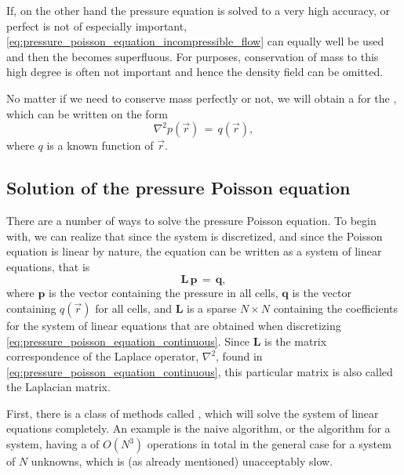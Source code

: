 If, on the other hand the pressure equation is solved to a very high accuracy, or perfect  is not of especially important, \eqref{eq:pressure_poisson_equation_incompressible_flow} can equally well be used and then the  becomes superfluous. For \simulation purposes, conservation of mass to this high degree is often not important and hence the density field can be omitted.

No matter if we need to conserve mass perfectly or not, we will obtain a  for the , which can be written on the form
%
\begin{equation} \label{eq:pressure_poisson_equation_continuous}
\nabla^2 p(\vec{r}) \,=\, q(\vec{r}),
\end{equation}
%
where $q$ is a known function of $\vec{r}$.

\subsection{Solution of the pressure Poisson equation}

\label{sec:pressure_poisson_equation_solution}

There are a number of ways to solve the pressure Poisson equation. To begin with, we can realize that since the system is discretized, and since the Poisson equation is linear by nature, the equation can be written as a system of linear equations, that is
%
\begin{equation} \label{eq:pressure_poisson_equation_matrix}
\mathbf{L\,p} \,=\, \mathbf{q},
\end{equation}
%
where $\mathbf{p}$ is the vector containing the pressure in all cells, $\mathbf{q}$ is the vector containing $q(\vec{r})$ for all cells, and $\mathbf{L}$ is a sparse $N\times N$  containing the coefficients for the system of linear equations that are obtained when discretizing \eqref{eq:pressure_poisson_equation_continuous}. Since $\mathbf{L}$ is the matrix correspondence of the Laplace operator, $\nabla^2$, found in \eqref{eq:pressure_poisson_equation_continuous}, this particular matrix is also called the Laplacian matrix.

First, there is a class of methods called , which will solve the system of linear equations completely. An example is the naive  algorithm, or the  algorithm for a  system, having a  of $O(N^3)$ operations in total in the general case for a system of $N$ unknowns, which is (as already mentioned) unacceptably slow.

